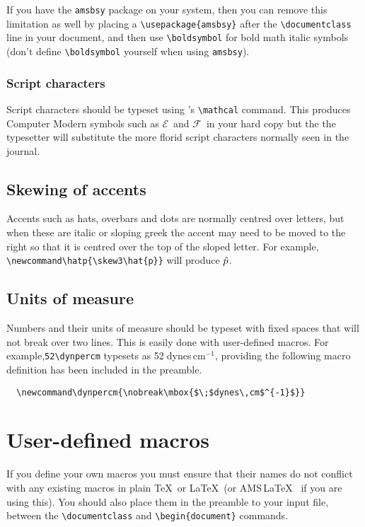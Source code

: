 \documentclass{jfm}
\newcommand\dynpercm{\nobreak\mbox{$\;$dynes\,cm$^{-1}$}}
\newcommand\hatp{\skew3\hat{p}}      %
\providecommand\AMSLaTeX{AMS\,\LaTeX}
\begin{document}
If you have the \verb"amsbsy" package on your system, then you can remove
this limitation as well by placing a \verb"\usepackage{amsbsy}" after the
\verb"\documentclass" line in your document, and then use \verb"\boldsymbol"
for bold math italic symbols (don't define \verb"\boldsymbol" yourself when
using \verb"amsbsy").

\subsubsection{Script characters}

Script characters should be typeset using \LaTeXe's \verb"\mathcal"
command. This produces Computer Modern symbols such as $\mathcal{E}\,$
and $\mathcal{F}\,$ in your hard copy but the the typesetter will substitute
the more florid script characters normally seen in the journal.

\subsection{Skewing of accents}

Accents such as hats, overbars and dots are normally centred over letters,
but when these are italic or sloping greek the accent may need to be moved
to the right so that it is centred over the top of the sloped letter. For
example, \verb"\newcommand\hatp{\skew3\hat{p}}" will produce $\hatp$.

\subsection{Units of measure}

Numbers and their units of measure should be typeset with fixed spaces
that will not break over two lines. This is easily done with user-defined
macros. For example,\linebreak \verb"52\dynpercm" typesets as
52\dynpercm , providing the following macro definition has been included
in the preamble.
%
\begin{verbatim}
  \newcommand\dynpercm{\nobreak\mbox{$\;$dynes\,cm$^{-1}$}}
\end{verbatim}

\section{User-defined macros}\label{secUser}

If you define your own macros you must ensure that their names do not
conflict with any existing macros in plain \TeX\ or \LaTeX\ (or \AMSLaTeX\ %
if you are using this). You should also place them in the preamble to
your input file, between the \verb"\documentclass" and
\verb"\begin{document}" commands.
\end{document}
